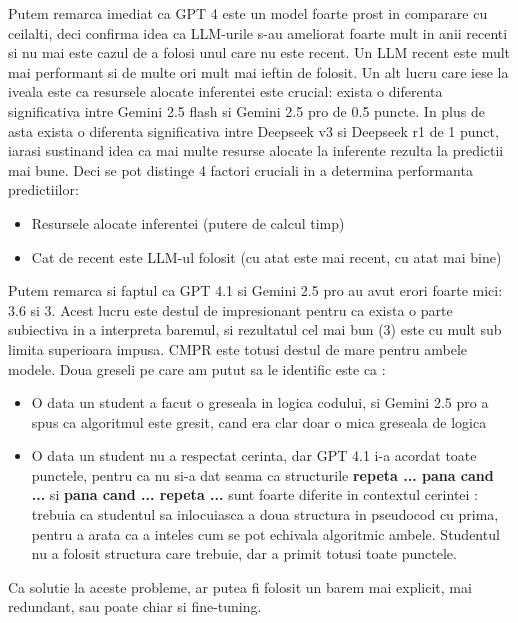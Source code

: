 \documentclass[12pt, a4paper]{report}
\begin{document}
Putem remarca imediat ca GPT 4 este un model foarte prost in comparare cu ceilalti, deci confirma idea ca LLM-urile s-au ameliorat foarte mult in anii recenti 
si nu mai este cazul de a folosi unul care nu este recent. Un LLM recent este mult mai performant si de multe ori mult mai ieftin de folosit.
Un alt lucru care iese la iveala este ca resursele alocate inferentei este crucial: exista o diferenta significativa intre Gemini 2.5 flash si Gemini 2.5 pro de 0.5 puncte.
In plus de asta exista o diferenta significativa intre Deepseek v3 si Deepseek r1 de 1 punct, iarasi sustinand idea ca mai multe resurse alocate la inferente rezulta la predictii mai bune.
Deci se pot distinge 4 factori cruciali in a determina performanta predictiilor:
\begin{itemize}
  \item Resursele alocate inferentei (putere de calcul \times timp)
  \item Cat de recent este LLM-ul folosit (cu atat este mai recent, cu atat mai bine)
\end{itemize}

Putem remarca si faptul ca GPT 4.1  si Gemini 2.5 pro au avut erori foarte mici: 3.6 si 3. Acest lucru este destul de impresionant pentru ca exista o parte subiectiva
in a interpreta baremul, si rezultatul cel mai bun (3) este cu mult sub limita superioara impusa. CMPR este totusi destul de mare pentru ambele modele.
Doua greseli pe care am putut sa le identific este ca :
\begin{itemize}
  \item O data un student a facut o greseala in logica codului, si Gemini 2.5 pro a spus ca algoritmul este gresit, cand era clar doar o mica greseala de logica
  \item O data un student nu a respectat cerinta, dar GPT 4.1 i-a acordat toate punctele, pentru ca nu si-a dat seama ca structurile \textbf{repeta ... pana cand ...} si \textbf{pana cand ... repeta ...}
  sunt foarte diferite in contextul cerintei : trebuia ca studentul sa inlocuiasca a doua structura in pseudocod cu prima, pentru a arata ca a inteles cum se pot echivala algoritmic ambele.
  Studentul nu a folosit structura care trebuie, dar a primit totusi toate punctele.
\end{itemize}

Ca solutie la aceste probleme, ar putea fi folosit un barem mai explicit, mai redundant, sau poate chiar si fine-tuning.
\end{document}
